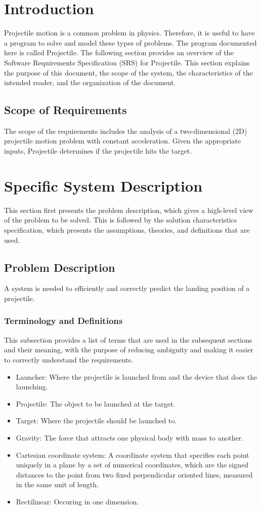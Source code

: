 \documentclass[12pt]{article}
\begin{document}
\section{Introduction}
\label{Sec:Intro}
Projectile motion is a common problem in physics. Therefore, it is useful to have a program to solve and model these types of problems. The program documented here is called Projectile.
The following section provides an overview of the Software Requirements Specification (SRS) for Projectile. This section explains the purpose of this document, the scope of the system, the characteristics of the intended reader, and the organization of the document.
\subsection{Scope of Requirements}
\label{Sec:ReqsScope}
The scope of the requirements includes the analysis of a two-dimensional (2D) projectile motion problem with constant acceleration. Given the appropriate inputs, Projectile determines if the projectile hits the target.
\section{Specific System Description}
\label{Sec:SpecSystDesc}
This section first presents the problem description, which gives a high-level view of the problem to be solved. This is followed by the solution characteristics specification, which presents the assumptions, theories, and definitions that are used.
\subsection{Problem Description}
\label{Sec:ProbDesc}
A system is needed to efficiently and correctly predict the landing position of a projectile.
\subsubsection{Terminology and Definitions}
\label{Sec:TermDefs}
This subsection provides a list of terms that are used in the subsequent sections and their meaning, with the purpose of reducing ambiguity and making it easier to correctly understand the requirements.
\begin{itemize}
\item{Launcher: Where the projectile is launched from and the device that does the launching.}
\item{Projectile: The object to be launched at the target.}
\item{Target: Where the projectile should be launched to.}
\item{Gravity: The force that attracts one physical body with mass to another.}
\item{Cartesian coordinate system: A coordinate system that specifies each point uniquely in a plane by a set of numerical coordinates, which are the signed distances to the point from two fixed perpendicular oriented lines, measured in the same unit of length.}
\item{Rectilinear: Occuring in one dimension.}
\end{itemize}
\end{document}
